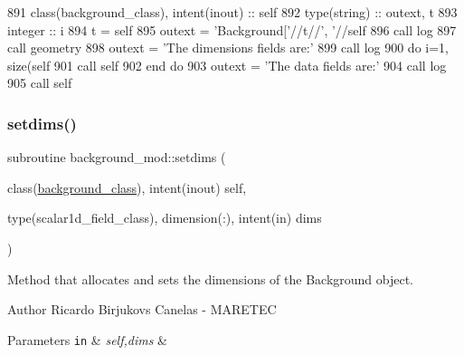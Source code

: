 \begin{DoxyCode}
891     \textcolor{keywordtype}{class}(background\_class), \textcolor{keywordtype}{intent(inout)} :: self
892     \textcolor{keywordtype}{type}(string) :: outext, t
893     \textcolor{keywordtype}{integer} :: i
894     t = self%
895     outext = \textcolor{stringliteral}{'Background['}//t//\textcolor{stringliteral}{', '}//self%
896     \textcolor{keyword}{call }log%
897     \textcolor{keyword}{call }geometry%
898     outext = \textcolor{stringliteral}{'The dimensions fields are:'}
899     \textcolor{keyword}{call }log%
900     \textcolor{keywordflow}{do} i=1, \textcolor{keyword}{size}(self%
901         \textcolor{keyword}{call }self%
902 \textcolor{keywordflow}{    end do}
903     outext = \textcolor{stringliteral}{'The data fields are:'}
904     \textcolor{keyword}{call }log%
905     \textcolor{keyword}{call }self%
\end{DoxyCode}
\mbox{\label{namespacebackground__mod_a06d96d4627391d74feb105a842a87dc0}} 
\subsubsection{\texorpdfstring{setdims()}{setdims()}}
{\footnotesize\ttfamily subroutine background\+\_\+mod\+::setdims (\begin{DoxyParamCaption}\item[{class(\mbox{\hyperlink{structbackground__mod_1_1background__class}{background\+\_\+class}}), intent(inout)}]{self,  }\item[{type(scalar1d\+\_\+field\+\_\+class), dimension(\+:), intent(in)}]{dims }\end{DoxyParamCaption})\hspace{0.3cm}{\ttfamily [private]}}



Method that allocates and sets the dimensions of the Background object. 

\begin{DoxyAuthor}{Author}
Ricardo Birjukovs Canelas -\/ M\+A\+R\+E\+T\+EC 
\end{DoxyAuthor}

\begin{DoxyParams}[1]{Parameters}
\mbox{\tt in}  & {\em self,dims} & \\
\hline
\end{DoxyParams}


